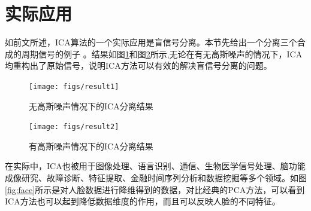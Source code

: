 \documentclass[UTF8,zihao=5,a4paper]{ctexart}
\begin{document}




\section{实际应用}
如前文所述，ICA算法的一个实际应用是盲信号分离。本节先给出一个分离三个合成的周期信号的例子\cite{example} 。结果如图\ref{fig:result1}和图\ref{fig:result2}所示,无论在有无高斯噪声的情况下，ICA均重构出了原始信号，说明ICA方法可以有效的解决盲信号分离的问题。

\begin{figure}[h]
    \centering
    \texttt{[image: figs/result1]}
    \caption{无高斯噪声情况下的ICA分离结果}
    \label{fig:result1}
\end{figure}


\begin{figure}[h]
    \centering
    \texttt{[image: figs/result2]}
    \caption{有高斯噪声情况下的ICA分离结果}
    \label{fig:result2}
\end{figure}

在实际中，ICA也被用于图像处理、语言识别、通信、生物医学信号处理、脑功能成像研究、故障诊断、特征提取、金融时间序列分析和数据挖掘等多个领域。如图\ref{fig:face}所示是对人脸数据进行降维得到的数据，对比经典的PCA方法，可以看到ICA方法也可以起到降低数据维度的作用，而且可以反映人脸的不同特征。
\end{document}
